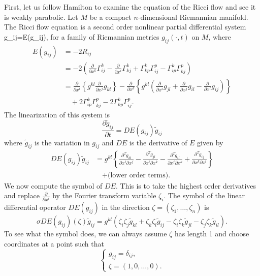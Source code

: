 First, let us follow Hamilton \cite{Ha82} to examine the equation
of the Ricci flow and see it is weakly parabolic. Let $M$ be a
compact $n$-dimensional Riemannian manifold. The Ricci flow
equation is a second order nonlinear partial differential system
\be
{}g_{ij}=E(g_{ij}),%
\ee for a family of Riemannian metrics $g_{ij}(\cdot,t)$ on $M$,
where
\begin{align*}
E(g_{ij})&  =  -2R_{ij}\\
&  =  -2\left(\frac{\partial}{\partial x^k}
\Gamma^k_{ij}-\frac{\partial}{\partial x^i}\Gamma^k_{kj}
+\Gamma^k_{kp}\Gamma^p_{ij}-\Gamma^k_{ip}\Gamma^p_{kj}\right)\\
&  = \frac{\partial}{\partial x^i}
\left\{g^{kl}\frac{\partial}{\partial x^j}g_{kl}\right\}
-\frac{\partial}{\partial x^k}
\left\{g^{kl}\left(\frac{\partial}{\partial x^i}g_{jl}
+\frac{\partial}{\partial x^j}g_{il}
-\frac{\partial}{\partial x^l}g_{ij}\right)\right\}\\
&\quad  +2\Gamma^k_{ip}\Gamma^p_{kj}-2\Gamma^k_{kp}\Gamma^p_{ij}.
\end{align*}
The linearization of this system is
$$
\frac{\partial \tilde{g}_{ij}}{\partial t}=DE(g_{ij})
\tilde{g}_{ij}
$$
where $\tilde{g}_{ij}$ is the variation in $g_{ij}$ and $DE$ is
the derivative of $E$ given by
\begin{align*}
DE(g_{ij})\tilde{g}_{ij}&  = g^{kl}\left\{\frac{\partial^2
\tilde{g}_{kl}}{\partial x^i \partial x^j}-\frac{\partial^2
\tilde{g}_{jl}}{\partial x^i \partial x^k}-\frac{\partial^2
\tilde{g}_{il}}{\partial x^j \partial x^k}+\frac{\partial^2
\tilde{g}_{ij}}{\partial x^k \partial x^l}\right\}\\
& \quad + \text{(lower order terms).}
\end{align*}
We now compute the symbol of $DE$. This is to take the highest
order derivatives and replace $\frac{\partial}{\partial x^i}$ by
the Fourier transform variable $\zeta_i$. The symbol of the linear
differential operator $DE(g_{ij})$ in the direction
$\zeta=(\zeta_1 , \ldots,\zeta_n )$ is
$$
\sigma DE(g_{ij})(\zeta)\tilde{g}_{ij} =g^{kl}(\zeta_i \zeta_j
\tilde{g}_{kl} + \zeta_k \zeta_l \tilde{g}_{ij} -\zeta_i \zeta_k
\tilde{g}_{jl} -\zeta_j \zeta_k \tilde{g}_{il}).
$$
To see what the symbol does, we can always assume $\zeta$ has
length 1 and choose coordinates at a point such that
$$
      \left\{
       \begin{array}{lll}
       \displaystyle
g_{ij}=\delta_{ij},
          \\[4mm]
      \displaystyle
\zeta=(1,0,\ldots,0).
       \end{array}
      \right.
$$
